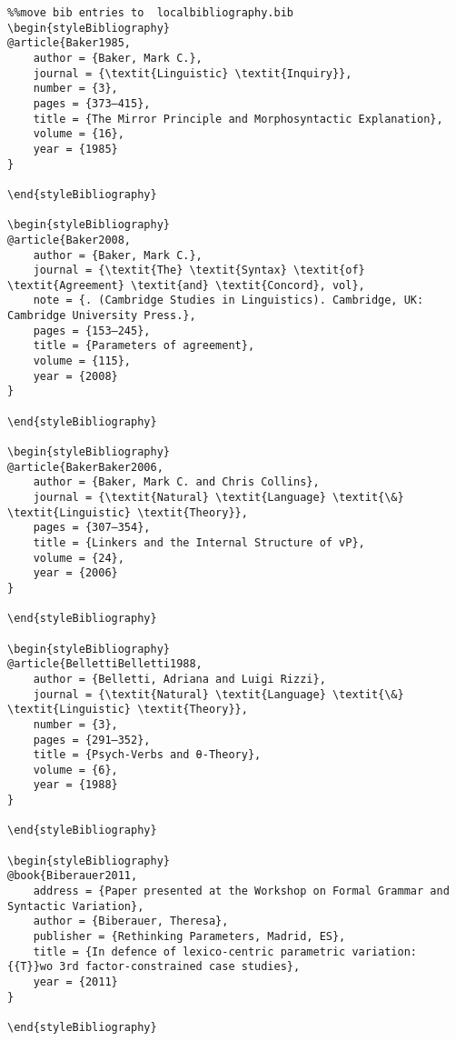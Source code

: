 \documentclass[output=paper,modfonts,nonflat]{langsci/langscibook}
\begin{document}
\begin{verbatim}%%move bib entries to  localbibliography.bib
\begin{styleBibliography}
@article{Baker1985,
	author = {Baker, Mark C.},
	journal = {\textit{Linguistic} \textit{Inquiry}},
	number = {3},
	pages = {373–415},
	title = {The Mirror Principle and Morphosyntactic Explanation},
	volume = {16},
	year = {1985}
}

\end{styleBibliography}

\begin{styleBibliography}
@article{Baker2008,
	author = {Baker, Mark C.},
	journal = {\textit{The} \textit{Syntax} \textit{of} \textit{Agreement} \textit{and} \textit{Concord}, vol},
	note = {. (Cambridge Studies in Linguistics). Cambridge, UK: Cambridge University Press.},
	pages = {153–245},
	title = {Parameters of agreement},
	volume = {115},
	year = {2008}
}

\end{styleBibliography}

\begin{styleBibliography}
@article{BakerBaker2006,
	author = {Baker, Mark C. and Chris Collins},
	journal = {\textit{Natural} \textit{Language} \textit{\&} \textit{Linguistic} \textit{Theory}},
	pages = {307–354},
	title = {Linkers and the Internal Structure of vP},
	volume = {24},
	year = {2006}
}

\end{styleBibliography}

\begin{styleBibliography}
@article{BellettiBelletti1988,
	author = {Belletti, Adriana and Luigi Rizzi},
	journal = {\textit{Natural} \textit{Language} \textit{\&} \textit{Linguistic} \textit{Theory}},
	number = {3},
	pages = {291–352},
	title = {Psych-Verbs and θ-Theory},
	volume = {6},
	year = {1988}
}

\end{styleBibliography}

\begin{styleBibliography}
@book{Biberauer2011,
	address = {Paper presented at the Workshop on Formal Grammar and Syntactic Variation},
	author = {Biberauer, Theresa},
	publisher = {Rethinking Parameters, Madrid, ES},
	title = {In defence of lexico-centric parametric variation: {{T}}wo 3rd factor-constrained case studies},
	year = {2011}
}

\end{styleBibliography}


\end{verbatim}
\end{document}
